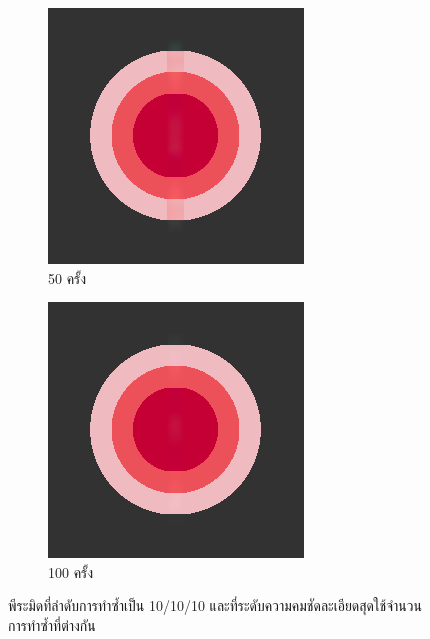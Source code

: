 \begin{figure}[H]
\begin{subfigure}{0.4\linewidth}
        \includegraphics[width=0.7\linewidth]{image/just10enough/only50time.png}			
        \caption{50 ครั้ง}
    \end{subfigure}
    \begin{subfigure}{0.4\linewidth}
        \centering
        \includegraphics[width=0.7\linewidth]{image/just10enough/only100time.png}			
        \caption{100 ครั้ง}
    \end{subfigure}
    \caption{พีระมิดที่ลำดับการทำซ้ำเป็น 10/10/10 และที่ระดับความคมชัดละเอียดสุดใช้จำนวนการทำซ้ำที่ต่างกัน}
\end{figure}